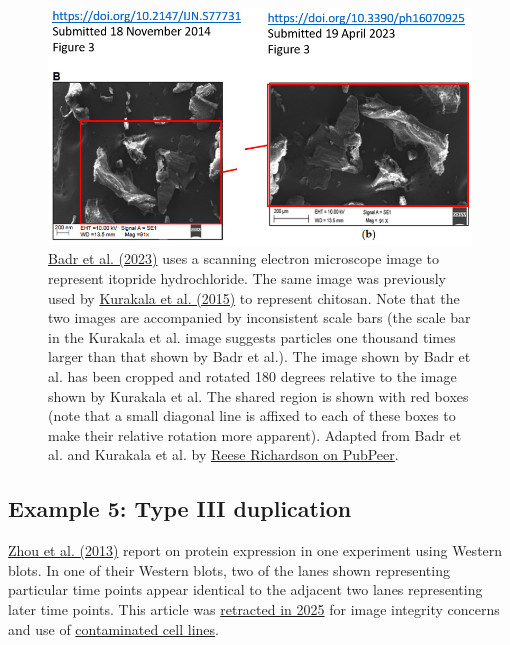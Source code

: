 \documentclass[letterpaper, 12pt]{article}
\begin{document}
\begin{figure}[h!tbp]
    \centering
    \includegraphics[width=\textwidth]{img/image_duplication/image-1741998932949.jpg}
    \caption*{\href{https://doi.org/10.3390/ph16070925}{Badr et al. (2023)} uses a scanning electron microscope image to represent itopride hydrochloride. The same image was previously used by \href{https://doi.org/10.2147/ijn.s77731}{Kurakala et al. (2015)} to represent chitosan. Note that the two images are accompanied by inconsistent scale bars (the scale bar in the Kurakala et al. image suggests particles one thousand times larger than that shown by Badr et al.). The image shown by Badr et al. has been cropped and rotated 180 degrees relative to the image shown by Kurakala et al. The shared region is shown with red boxes (note that a small diagonal line is affixed to each of these boxes to make their relative rotation more apparent). Adapted from Badr et al. and Kurakala et al. by \href{https://pubpeer.com/publications/30DDCFCF4925C0DD401AA9810AC0A3}{Reese Richardson on PubPeer}.}
\end{figure}

\pagebreak

\subsection*{Example 5: Type III duplication}

\href{https://doi.org/10.1371/journal.pone.0058855}{Zhou et al. (2013)} report on protein expression in one experiment using Western blots. In one of their Western blots, two of the lanes shown representing particular time points appear identical to the adjacent two lanes representing later time points. This article was \href{https://doi.org/10.1371/journal.pone.0322907}{retracted in 2025} for image integrity concerns and use of \href{https://osf.io/d7we5}{contaminated cell lines}.
\end{document}
